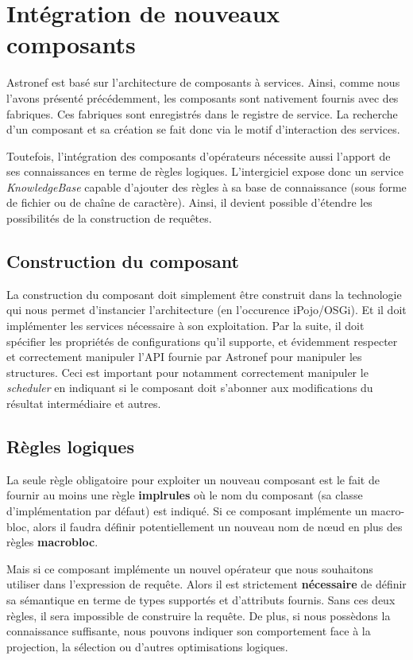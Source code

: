 \section{Intégration de nouveaux composants}\label{sec:contrib:astronef:integration}
Astronef est basé sur l'architecture de composants à services. Ainsi, comme nous l'avons présenté précédemment, les composants sont nativement fournis avec des fabriques. Ces fabriques sont enregistrés dans le registre de service. La recherche d'un composant et sa création se fait donc via le motif d'interaction des services.

Toutefois, l'intégration des composants d'opérateurs nécessite aussi l'apport de ses connaissances en terme de règles logiques. L'intergiciel expose donc un service \textit{KnowledgeBase} capable d'ajouter des règles  à sa base de connaissance (sous forme de fichier ou de chaîne de caractère). Ainsi, il devient possible d'étendre les possibilités de la construction de requêtes.
\subsection{Construction du composant}
La construction du composant doit simplement être construit dans la technologie qui nous permet d'instancier l'architecture (en l'occurence iPojo/OSGi). Et il doit implémenter les services nécessaire à son exploitation. Par la suite, il doit spécifier les propriétés de configurations qu'il supporte, et évidemment respecter et correctement manipuler l'API fournie par Astronef pour manipuler les structures. Ceci est important pour notamment correctement manipuler le \textit{scheduler} en indiquant si le composant doit s'abonner aux modifications du résultat intermédiaire et autres.

\subsection{Règles logiques}
La seule règle obligatoire pour exploiter un nouveau composant est le fait de fournir au moins une règle \textbf{implrules} où le nom du composant (sa classe d'implémentation par défaut) est indiqué. Si ce composant implémente un macro-bloc, alors il faudra définir potentiellement un nouveau nom de nœud en plus des règles \textbf{macrobloc}.

Mais si ce composant implémente un nouvel opérateur que nous souhaitons utiliser dans l'expression de requête. Alors il est strictement \textbf{nécessaire} de définir sa sémantique en terme de types supportés et d'attributs fournis. Sans ces deux règles, il sera impossible de construire la requête. De plus, si nous possèdons la connaissance suffisante, nous pouvons indiquer son comportement face à la projection, la sélection ou d'autres optimisations logiques.

